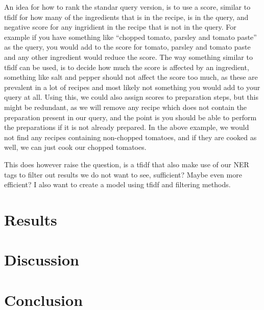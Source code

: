 \documentclass[11pt]{article}
\begin{document}
An idea for how to rank the standar query version, is to use a score, similar to
tfidf for how many of the ingredients that is in the recipe, is in the query,
and negative score for any ingridient in the recipe that is not in the query.
For example if you have something like ``chopped tomato, parsley and tomato
paste'' as the query, you would add to the score for tomato, parsley and tomato
paste and any other ingredient would reduce the score.
The way something similar to tfidf can be used, is to decide how much the score
is affected by an ingredient, something like salt and pepper should not affect
the score too much, as these are prevalent in a lot of recipes and most likely
not something you would add to your query at all.
Using this, we could also assign scores to preparation steps, but this might be
redundant, as we will remove any recipe which does not contain the preparation
present in our query, and the point is you should be able to perform the
preparations if it is not already prepared.
In the above example, we would not find any recipes containing non-chopped
tomatoes, and if they are cooked as well, we can just cook our chopped tomatoes.

This does however raise the question, is a tfidf that also make use of our NER
tags to filter out results we do not want to see, sufficient? Maybe even more
efficient?
I also want to create a model using tfidf and filtering methods.
\fi

\section{Results}
\section{Discussion}
\section{Conclusion}



\appendix
\end{document}
